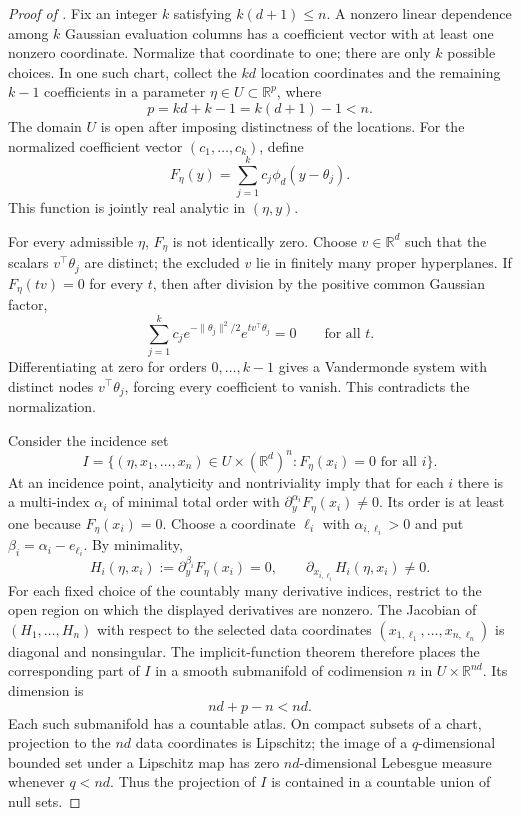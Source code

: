 \documentclass[11pt]{article}
\theoremstyle{definition}
\theoremstyle{remark}
\newcommand{\RR}{\mathbb R}
\newcommand{\norm}[1]{\lVert #1\rVert}
\begin{document}
\begin{proof}[Proof of ]
Fix an integer $k$ satisfying $k(d+1)\le n$.  A nonzero linear dependence
among $k$ Gaussian evaluation columns has a coefficient vector with at least
one nonzero coordinate.  Normalize that coordinate to one; there are only
$k$ possible choices.  In one such chart, collect the $kd$ location
coordinates and the remaining $k-1$ coefficients in a parameter
$\eta\in U\subset\RR^p$, where
\[
 p=kd+k-1=k(d+1)-1<n.
\]
The domain $U$ is open after imposing distinctness of the locations.  For the
normalized coefficient vector $(c_1,\ldots,c_k)$, define
\[
 F_\eta(y)=\sum_{j=1}^kc_j\phi_d(y-\theta_j).
\]
This function is jointly real analytic in $(\eta,y)$.

For every admissible $\eta$, $F_\eta$ is not identically zero.  Choose
$v\in\RR^d$ such that the scalars $v^\top\theta_j$ are distinct; the excluded
$v$ lie in finitely many proper hyperplanes.  If $F_\eta(tv)=0$ for every
$t$, then after division by the positive common Gaussian factor,
\[
 \sum_{j=1}^kc_j e^{-\norm{\theta_j}^2/2}e^{t v^\top\theta_j}=0
 \qquad\text{for all }t.
\]
Differentiating at zero for orders $0,\ldots,k-1$ gives a Vandermonde system
with distinct nodes $v^\top\theta_j$, forcing every coefficient to vanish.
This contradicts the normalization.

Consider the incidence set
\[
 I=\{(\eta,x_1,\ldots,x_n)\in U\times(\RR^d)^n:
        F_\eta(x_i)=0\text{ for all }i\}.
\]
At an incidence point, analyticity and nontriviality imply that for each $i$
there is a multi-index $\alpha_i$ of minimal total order with
$\partial_y^{\alpha_i}F_\eta(x_i)\ne0$.  Its order is at least one because
$F_\eta(x_i)=0$.  Choose a coordinate $\ell_i$ with
$\alpha_{i,\ell_i}>0$ and put $\beta_i=\alpha_i-e_{\ell_i}$.  By minimality,
\[
 H_i(\eta,x_i):=\partial_y^{\beta_i}F_\eta(x_i)=0,
 \qquad
 \partial_{x_{i,\ell_i}}H_i(\eta,x_i)\ne0.
\]
For each fixed choice of the countably many derivative indices, restrict to
the open region on which the displayed derivatives are nonzero.  The
Jacobian of $(H_1,\ldots,H_n)$ with respect to the selected data coordinates
$(x_{1,\ell_1},\ldots,x_{n,\ell_n})$ is diagonal and nonsingular.  The
implicit-function theorem therefore places the corresponding part of $I$ in
a smooth submanifold of codimension $n$ in
$U\times\RR^{nd}$.  Its dimension is
\[
 nd+p-n<nd.
\]
Each such submanifold has a countable atlas.  On compact subsets of a chart,
projection to the $nd$ data coordinates is Lipschitz; the image of a
$q$-dimensional bounded set under a Lipschitz map has zero
$nd$-dimensional Lebesgue measure whenever $q<nd$.  Thus the projection of
$I$ is contained in a countable union of null sets.


\end{proof}
\end{document}
